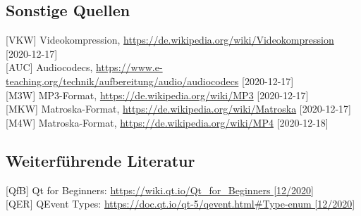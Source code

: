 \documentclass{article}
\begin{document}
    \subsection{Sonstige Quellen}
    {[}VKW{]} Videokompression, \url{https://de.wikipedia.org/wiki/Videokompression} {[}2020-12-17{]} \\
    {[}AUC{]} Audiocodecs, \url{https://www.e-teaching.org/technik/aufbereitung/audio/audiocodecs} {[}2020-12-17{]}\\
    {[}M3W{]} MP3-Format, \url{https://de.wikipedia.org/wiki/MP3} {[}2020-12-17{]}\\
    {[}MKW{]} Matroska-Format, \url{https://de.wikipedia.org/wiki/Matroska} {[}2020-12-17{]}\\
    {[}M4W{]} Matroska-Format, \url{https://de.wikipedia.org/wiki/MP4} {[}2020-12-18{]}\\

    \subsection{Weiterführende Literatur}
    {[}QfB{]} Qt for Beginners: \url{https://wiki.qt.io/Qt\_for\_Beginners [12/2020]}\\
    {[}QER{]} QEvent Types: \url{https://doc.qt.io/qt-5/qevent.html\#Type-enum [12/2020]}\\
\end{document}
